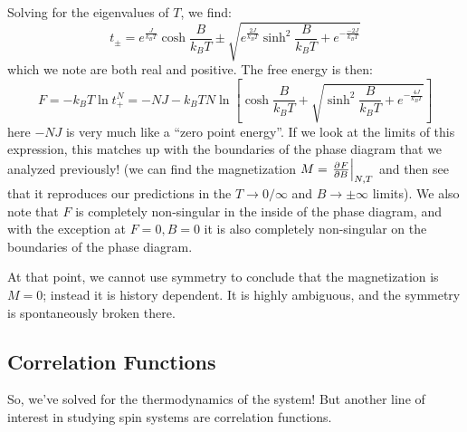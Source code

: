 Solving for the eigenvalues of $T$, we find:
\begin{equation}
    t_\pm = e^{\frac{J}{k_B T}}\cosh\frac{B}{k_B T} \pm \sqrt{e^{\frac{2J}{k_B T}}\sinh^2\frac{B}{k_B T} + e^{-\frac{-2J}{k_B T}}}
\end{equation}
which we note are both real and positive. The free energy is then:
\begin{equation}
    F = -k_B T\ln t_+^N = -N J - k_B T N\ln\left[\cosh\frac{B}{k_B T} + \sqrt{\sinh^2\frac{B}{k_B T} + e^{-\frac{4J}{k_B T}}}\right]
\end{equation}
here $-NJ$ is very much like a ``zero point energy''. If we look at the limits of this expression, this matches up with the boundaries of the phase diagram that we analyzed previously! (we can find the magnetization $M = \left.\pd{F}{B}\right|_{N, T}$ and then see that it reproduces our predictions in the $T \to 0/\infty$ and $B \to \pm \infty$ limits). We also note that $F$ is completely non-singular in the inside of the phase diagram, and with the exception at $F = 0, B = 0$ it is also completely non-singular on the boundaries of the phase diagram.

At that point, we cannot use symmetry to conclude that the magnetization is $M = 0$; instead it is history dependent. It is highly ambiguous, and the symmetry is spontaneously broken there.

\subsection{Correlation Functions}
So, we've solved for the thermodynamics of the system! But another line of interest in studying spin systems are correlation functions.

